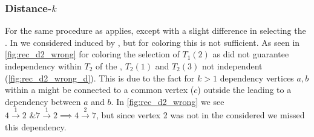 	\subsubsection{Distance-$k$}
	For \DK the same procedure as \DONE applies, except with a slight difference in selecting the \subgraph. In \DONE we considered \subgraphs induced by \levelGroups, but for \DK coloring this is not sufficient. As seen in \cref{fig:rec_d2_wrong} for \DTWO coloring the selection of $T_1(2)$ as \subgraph did not guarantee \DTWO independency within \levelGroup $T_2$ of the \subgraph, $T_2(1)$ and $T_2(3)$ not independent (\cf \cref{fig:rec_d2_wrong_d}). This is due to the fact for $k>1$ dependency vertices $a,b$ within a \subgraph might be connected to a common vertex ($c$) outside the \subgraph leading to a \DK dependency between $a$ and $b$. In \cref{fig:rec_d2_wrong} we see 	$4 \xrightarrow{1} 2 \text{ \& } 7 \xrightarrow{1} 2 	\implies 4 \xrightarrow{2} 7$, but since vertex 2 was not in the \subgraph considered we missed this dependency. 

